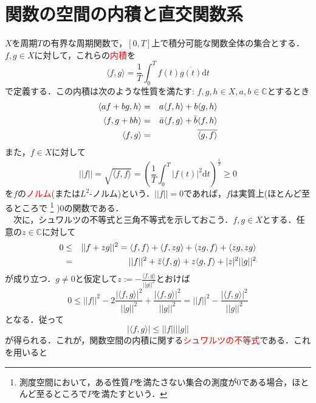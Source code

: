 \documentclass[a4j]{jsbook}
\numberwithin{theorem}{chapter}  %
\begin{document}
\section{関数の空間の内積と直交関数系} \label{sec1-8}
\(X\)を周期\(T\)の有界な周期関数で，\([0, T]\)上で積分可能な関数全体の集合とする．\(f, g\in X\)に対して，これらの\textcolor{red}{内積}を
\begin{equation*}
    \langle f, g\rangle=\frac{1}{T}\int_0^T f(t)\overline{g(t)}\mathrm{d}t
\end{equation*}
で定義する．この内積は次のような性質を満たす: \(f, g, h\in X, a, b\in\mathbb{C}\)とするとき
\begin{eqnarray*}
\langle af+bg, h\rangle&=&a\langle f, h\rangle+b\langle g, h\rangle \\
\langle f, g+bh\rangle&=&\Bar{a}\langle f, g\rangle+\Bar{b}\langle f, h\rangle \\
\langle f, g\rangle&=&\overline{\langle g, f\rangle}
\end{eqnarray*}
また，\(f\in X\)に対して
\begin{equation*}
    ||f||=\sqrt{\langle f, f\rangle}=\left(\frac{1}{T}\int_0^T |f(t)|^2\mathrm{d}t\right)^{\frac{1}{2}}\geq 0
\end{equation*}
を\(f\)の\textcolor{red}{ノルム}(または\(L^2\)-ノルム)という．\(||f||=0\)であれば，\(f\)は実質上(ほとんど至るところで
\footnote{
測度空間において，ある性質\(P\)を満たさない集合の測度が0である場合，ほとんど至るところで\(P\)を満たすという．
}
)0の関数である．\\
　次に，シュワルツの不等式と三角不等式を示しておこう．\(f, g\in X\)とする．任意の\(z\in\mathbb{C}\)に対して
\begin{eqnarray*}
0&\leq&||f+zg||^2=\langle f, f\rangle+\langle f, zg\rangle+\langle zg, f\rangle+\langle zg, zg\rangle \\
&=&||f||^2+\Bar{z}\langle f, g\rangle+z\langle g, f\rangle+|z|^2||g||^2
\end{eqnarray*}
が成り立つ．\(g\neq 0\)と仮定して\(\displaystyle z:=-\frac{\langle f, g\rangle}{||g||^2}\)とおけば
\begin{equation*}
    0\leq ||f||^2-2\frac{|\langle f, g\rangle|^2}{||g||^2}+\frac{|\langle f, g\rangle|^2}{||g||^2}=||f||^2-\frac{|\langle f, g\rangle|^2}{||g||^2}
\end{equation*}
となる．従って
\begin{equation}
    |\langle f, g\rangle|\leq ||f||||g|| \label{eq1-18}
\end{equation}
が得られる．これが，関数空間の内積に関する\textcolor{red}{シュワルツの不等式}である．これを用いると
\end{document}
